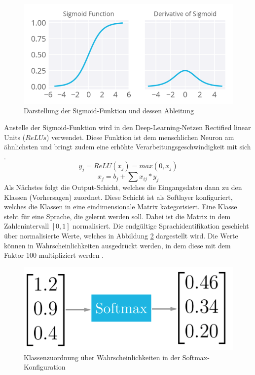\begin{figure}[h!]
	\centering
	\includegraphics[width=1.0\linewidth]{images/sigmund}
	\caption{Darstellung der Sigmoid-Funktion und dessen Ableitung \cite{Kulbear.2017}} %
	\label{fig:features11.0}
\end{figure}
Anstelle der Sigmoid-Funktion wird in den Deep-Learning-Netzen Rectified linear Units ($ReLUs$) verwendet. Diese Funktion ist dem menschlichen Neuron am ähnlichsten und bringt zudem eine erhöhte Verarbeitungsgeschwindigkeit mit sich \cite{zeiler.2013}. 
\begin{equation}
y_{j} = ReLU(x_{j}) = max(0,x_{j}) 
\label{eq:ReLU}
\end{equation}
\begin{equation}
x_{ j } = b_{ j } + \sum{ }{ }{ x_{ ij } * y_{j}}
\label{eq:Gewichte}
\end{equation}
Als Nächstes folgt die Output-Schicht, welches die Eingangsdaten dann zu den Klassen (Vorhersagen) zuordnet. Diese Schicht ist als Softlayer konfiguriert, welches die Klassen in eine eindimensionale Matrix kategorisiert. Eine Klasse steht für eine Sprache, die gelernt werden soll. Dabei ist die Matrix in dem Zahlenintervall $[0,1]$ normalisiert. Die endgültige Sprachidentifikation geschieht über normalisierte Werte, welches in Abbildung \ref{fig:soft} dargestellt wird. Die Werte können in Wahrscheinlichkeiten ausgedrückt werden, in dem diese mit dem Faktor 100 multipliziert werden \cite{Kulbear.2017}.
\begin{figure}[h!]
	\centering
	\includegraphics[width=0.7\linewidth]{images/softmax}
	\caption{Klassenzuordnung über Wahrscheinlichkeiten in der Softmax-Konfiguration \cite{Kulbear.2017}} %
	\label{fig:soft}
\end{figure}
